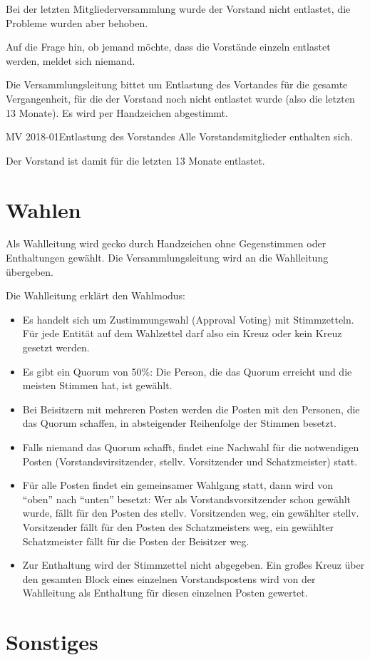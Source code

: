 \documentclass{s0minutes}
\begin{document}
Bei der letzten Mitgliederversammlung wurde der Vorstand nicht entlastet, die
Probleme wurden aber behoben.

Auf die Frage hin, ob jemand möchte, dass die Vorstände einzeln entlastet
werden, meldet sich niemand.

Die Versammlungsleitung bittet um Entlastung des Vortandes für die gesamte
Vergangenheit, für die der Vorstand noch nicht entlastet wurde (also die letzten
13 Monate). Es wird per Handzeichen abgestimmt.

\begin{resolution}{MV 2018-01}{}{Entlastung des
  Vorstandes}{}
  Alle Vorstandsmitglieder enthalten sich.
\end{resolution}

Der Vorstand ist damit für die letzten 13 Monate entlastet.

\section{Wahlen}

Als Wahlleitung wird gecko durch Handzeichen ohne Gegenstimmen oder
Enthaltungen gewählt. Die Versammlungsleitung wird an die Wahlleitung übergeben.

Die Wahlleitung erklärt den Wahlmodus:
\begin{itemize}
  \item Es handelt sich um Zustimmungswahl (Approval Voting) mit Stimmzetteln.
    Für jede Entität auf dem Wahlzettel darf also ein Kreuz oder kein Kreuz
    gesetzt werden.
  \item Es gibt ein Quorum von 50\%: Die Person, die das Quorum erreicht und die
    meisten Stimmen hat, ist gewählt.
  \item Bei Beisitzern mit mehreren Posten werden die Posten mit den Personen,
    die das Quorum schaffen, in absteigender Reihenfolge der Stimmen besetzt.
  \item Falls niemand das Quorum schafft, findet eine Nachwahl für die
    notwendigen Posten (Vorstandsvirsitzender, stellv. Vorsitzender und
    Schatzmeister) statt.
  \item Für alle Posten findet ein gemeinsamer Wahlgang statt, dann wird von
    "`oben"' nach "`unten"' besetzt: Wer als Vorstandsvorsitzender schon gewählt
    wurde, fällt für den Posten des stellv. Vorsitzenden weg, ein gewählter
    stellv. Vorsitzender fällt für den Posten des Schatzmeisters weg, ein
    gewählter Schatzmeister fällt für die Posten der Beisitzer weg.
  \item Zur Enthaltung wird der Stimmzettel nicht abgegeben. Ein großes Kreuz
    über den gesamten Block eines einzelnen Vorstandspostens wird von der
    Wahlleitung als Enthaltung für diesen einzelnen Posten gewertet.
\end{itemize}


\section{Sonstiges}

\end{document}
